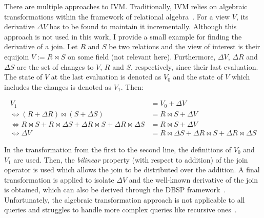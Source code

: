 There are multiple approaches to \ac{IVM}.
Traditionally, \ac{IVM} relies on algebraic transformations within the framework
of relational algebra~\cite{gupta1995maintenance, gupta1993maintaining, pgivm}.
For a view \(V\), its derivative \(\Delta V\) has to be found to maintain
it incrementally.
Although this approach is not used in this work, I provide a small example
for finding the derivative of a join.
Let \(R\) and \(S\) be two relations and the view of interest is their
equijoin \(V := R \bowtie S\) on some field (not relevant here).
Furthermore, \(\Delta V\), \(\Delta R\) and \(\Delta S\) are the set of changes
to \(V\), \(R\) and \(S\), respectively, since their last evaluation.
The state of \(V\) at the last evaluation is denoted as \(V_0\) and the
state of \(V\) which includes the changes is denoted as \(V_1\). Then:

\begin{equation}
	\begin{aligned}
		V_1                                                                                               & = V_0 + \Delta V                                                      \\
		\Leftrightarrow (R + \Delta R) \bowtie (S + \Delta S)                                             & = R \bowtie S + \Delta V                                              \\
		\Leftrightarrow R \bowtie S + R \bowtie \Delta S + \Delta R \bowtie S + \Delta R \bowtie \Delta S & = R \bowtie S + \Delta V                                              \\
		\Leftrightarrow \Delta V                                                                          & = R \bowtie \Delta S + \Delta R \bowtie S + \Delta R \bowtie \Delta S
	\end{aligned}
\end{equation}

In the transformation from the first to the second line, the definitions
of \(V_0\) and \(V_1\) are used.
Then, the \emph{bilinear} property (with respect to addition) of the join
operator is used which allows the join to be distributed over the addition.
A final transformation is applied to isolate \(\Delta V\) and the well-known
derivative of the join~\cite{idris2017dynamic} is obtained, which can also be
derived through the DBSP framework~\cite{budiu2025dbsp}.
Unfortunately, the algebraic transformation approach is not applicable
to all queries and struggles to handle more complex queries like
recursive ones~\cite{budiu2025dbsp}.

